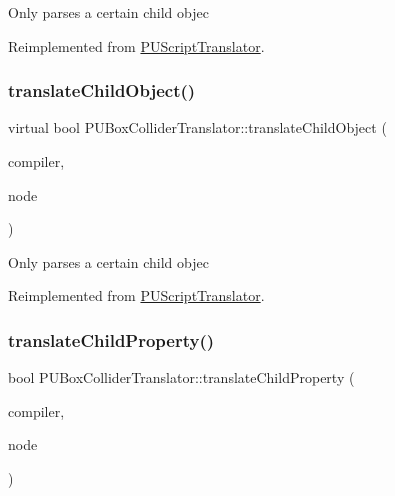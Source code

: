 Only parses a certain child objec 

Reimplemented from \hyperlink{classPUScriptTranslator_ab587d01348ae3e678cb700c719b2b113}{P\+U\+Script\+Translator}.

\mbox{\label{classPUBoxColliderTranslator_a899ed5304b2dd9b04d2ce752d7566adc}} 
\subsubsection{\texorpdfstring{translate\+Child\+Object()}{translateChildObject()}\hspace{0.1cm}{\footnotesize\ttfamily [2/2]}}
{\footnotesize\ttfamily virtual bool P\+U\+Box\+Collider\+Translator\+::translate\+Child\+Object (\begin{DoxyParamCaption}\item[{\hyperlink{classPUScriptCompiler}{P\+U\+Script\+Compiler} $\ast$}]{compiler,  }\item[{\hyperlink{classPUAbstractNode}{P\+U\+Abstract\+Node} $\ast$}]{node }\end{DoxyParamCaption})\hspace{0.3cm}{\ttfamily [virtual]}}

Only parses a certain child objec 

Reimplemented from \hyperlink{classPUScriptTranslator_ab587d01348ae3e678cb700c719b2b113}{P\+U\+Script\+Translator}.

\mbox{\label{classPUBoxColliderTranslator_afecc73c3759d1a0fe522dd0c53f8cf9c}} 
\subsubsection{\texorpdfstring{translate\+Child\+Property()}{translateChildProperty()}\hspace{0.1cm}{\footnotesize\ttfamily [1/2]}}
{\footnotesize\ttfamily bool P\+U\+Box\+Collider\+Translator\+::translate\+Child\+Property (\begin{DoxyParamCaption}\item[{\hyperlink{classPUScriptCompiler}{P\+U\+Script\+Compiler} $\ast$}]{compiler,  }\item[{\hyperlink{classPUAbstractNode}{P\+U\+Abstract\+Node} $\ast$}]{node }\end{DoxyParamCaption})\hspace{0.3cm}{\ttfamily [virtual]}}

